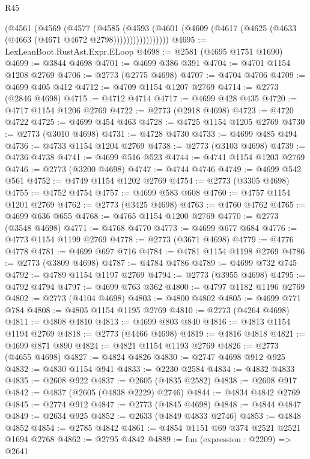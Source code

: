 \begin{lexlean}{R45}
\begin{coremodule}
              (@4561
                (@4569
                  (@4577
                    (@4585
                      (@4593
                        (@4601
                          (@4609 (@4617 (@4625 (@4633 (@4663 (@4671 @4672 @2798)))))))))))))))))
@4695 := LexLeanBoot.RustAst.Expr.ELoop
@4698 := @2581 (@4695 @1751 @1690)
@4699 := @3844 @4698
@4701 := @4699 @386 @391
@4704 := @4701 @1154 @1208 @2769
@4706 := @2773 (@2775 @4698)
@4707 := @4704 @4706
@4709 := @4699 @405 @412
@4712 := @4709 @1154 @1207 @2769
@4714 := @2773 (@2846 @4698)
@4715 := @4712 @4714
@4717 := @4699 @428 @435
@4720 := @4717 @1154 @1206 @2769
@4722 := @2773 (@2918 @4698)
@4723 := @4720 @4722
@4725 := @4699 @454 @463
@4728 := @4725 @1154 @1205 @2769
@4730 := @2773 (@3010 @4698)
@4731 := @4728 @4730
@4733 := @4699 @485 @494
@4736 := @4733 @1154 @1204 @2769
@4738 := @2773 (@3103 @4698)
@4739 := @4736 @4738
@4741 := @4699 @516 @523
@4744 := @4741 @1154 @1203 @2769
@4746 := @2773 (@3200 @4698)
@4747 := @4744 @4746
@4749 := @4699 @542 @561
@4752 := @4749 @1154 @1202 @2769
@4754 := @2773 (@3305 @4698)
@4755 := @4752 @4754
@4757 := @4699 @583 @608
@4760 := @4757 @1154 @1201 @2769
@4762 := @2773 (@3425 @4698)
@4763 := @4760 @4762
@4765 := @4699 @636 @655
@4768 := @4765 @1154 @1200 @2769
@4770 := @2773 (@3548 @4698)
@4771 := @4768 @4770
@4773 := @4699 @677 @684
@4776 := @4773 @1154 @1199 @2769
@4778 := @2773 (@3671 @4698)
@4779 := @4776 @4778
@4781 := @4699 @697 @716
@4784 := @4781 @1154 @1198 @2769
@4786 := @2773 (@3809 @4698)
@4787 := @4784 @4786
@4789 := @4699 @732 @745
@4792 := @4789 @1154 @1197 @2769
@4794 := @2773 (@3955 @4698)
@4795 := @4792 @4794
@4797 := @4699 @763 @362
@4800 := @4797 @1182 @1196 @2769
@4802 := @2773 (@4104 @4698)
@4803 := @4800 @4802
@4805 := @4699 @771 @784
@4808 := @4805 @1154 @1195 @2769
@4810 := @2773 (@4264 @4698)
@4811 := @4808 @4810
@4813 := @4699 @803 @840
@4816 := @4813 @1154 @1194 @2769
@4818 := @2773 (@4466 @4698)
@4819 := @4816 @4818
@4821 := @4699 @871 @890
@4824 := @4821 @1154 @1193 @2769
@4826 := @2773 (@4655 @4698)
@4827 := @4824 @4826
@4830 := @2747 @4698 @912 @925
@4832 := @4830 @1154 @941
@4833 := @2230 @2584
@4834 := @4832 @4833
@4835 := @2608 @922
@4837 := @2605 (@4835 @2582)
@4838 := @2608 @917
@4842 := @4837 (@2605 (@4838 @2229) @2746)
@4844 := @4834 @4842 @2769
@4845 := @2774 @912
@4847 := @2773 (@4845 @4698)
@4848 := @4844 @4847
@4849 := @2634 @925
@4852 := @2633 (@4849 @4833 @2746)
@4853 := @4848 @4852
@4854 := @2785 @4842
@4861 := @4854 @1151 @69 @374 @2521 @2521 @1694 @2768
@4862 := @2795 @4842
@4889 := fun (expression : @2209) =>
  @2641

\end{coremodule}
\end{lexlean}
